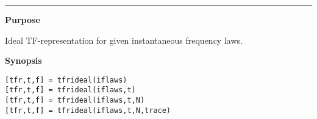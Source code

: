 

\hspace*{-1.6cm}{\Large \bf tfrideal}

\vspace*{-.4cm}
\hspace*{-1.6cm}\rule[0in]{16.5cm}{.02cm}
\vspace*{.2cm}

{\bf \large {}\selectfont Purpose}\\
\hspace*{1.5cm}
\begin{minipage}[t]{13.5cm}
Ideal TF-representation for given instantaneous frequency laws.
\end{minipage}
\vspace*{.3cm}

{\bf \large {}\selectfont Synopsis}\\
\hspace*{1.5cm}
\begin{minipage}[t]{13.5cm}
\begin{verbatim}
[tfr,t,f] = tfrideal(iflaws)
[tfr,t,f] = tfrideal(iflaws,t)
[tfr,t,f] = tfrideal(iflaws,t,N)
[tfr,t,f] = tfrideal(iflaws,t,N,trace)
\end{verbatim}
\end{minipage}
\vspace*{.5cm}

